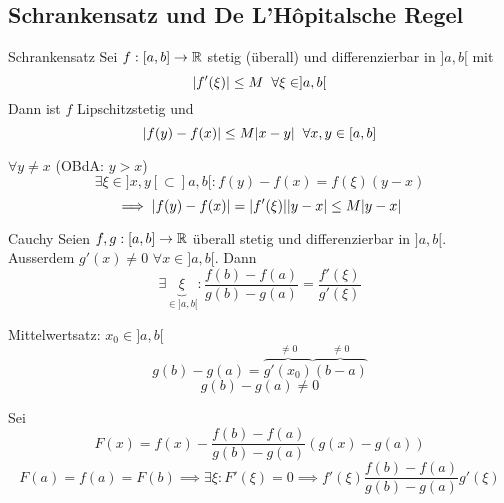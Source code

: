 \subsection{Schrankensatz und De L'Hôpitalsche Regel}
\begin{Sat}{Schrankensatz}
  Sei $f:[a,b]\to\mathbb{R}$ stetig (überall) und differenzierbar in $]a,b[$ mit
  \[\mathopen| f'(\xi) \mathclose|\leq M\hspace{2mm}\forall \xi\in ]a,b[\]
  Dann ist $f$ Lipschitzstetig und
  \[\mathopen| f(y)-f(x) \mathclose|\leq M\mathopen| x-y \mathclose|\hspace{2mm}\forall x,y\in [a,b]\]
\end{Sat}
\begin{Bew}
  $\forall y\neq x$ (OBdA: $y>x$)
  \[\exists \xi\in ]x,y[\subset ]a,b[: f(y)-f(x)=f(\xi)(y-x)\]
  \[\implies \mathopen| f(y)-f(x) \mathclose|=\mathopen| f'(\xi) \mathclose|\mathopen| y-x \mathclose|\leq M\mathopen| y-x \mathclose|\]
\end{Bew}
\begin{Sat}{Cauchy}
  Seien $f,g:[a,b]\to\mathbb{R}$ überall stetig und differenzierbar in $]a,b[$. Ausserdem $g'(x)\neq 0$ $\forall x\in ]a,b[$. Dann
  \[\exists \underbrace{\xi}_{\in ]a,b[}:\frac{f(b)-f(a)}{g(b)-g(a)}=\frac{f'(\xi)}{g'(\xi)}\]
\end{Sat}
\begin{Bem}
  Mittelwertsatz: $x_0\in ]a,b[$
  \[g(b)-g(a)=\overbrace{g'(x_0)}^{\neq 0}\overbrace{(b-a)}^{\neq 0}\]
  \[g(b)-g(a)\neq 0\]
\end{Bem}
\begin{Bew}
  Sei 
  \[F(x)=f(x)-\frac{f(b)-f(a)}{g(b)-g(a)}(g(x)-g(a))\]
  \[F(a)=f(a)=F(b)\implies \exists \xi: F'(\xi)=0\implies f'(\xi)\frac{f(b)-f(a)}{g(b)-g(a)}g'(\xi)\]
\end{Bew}
